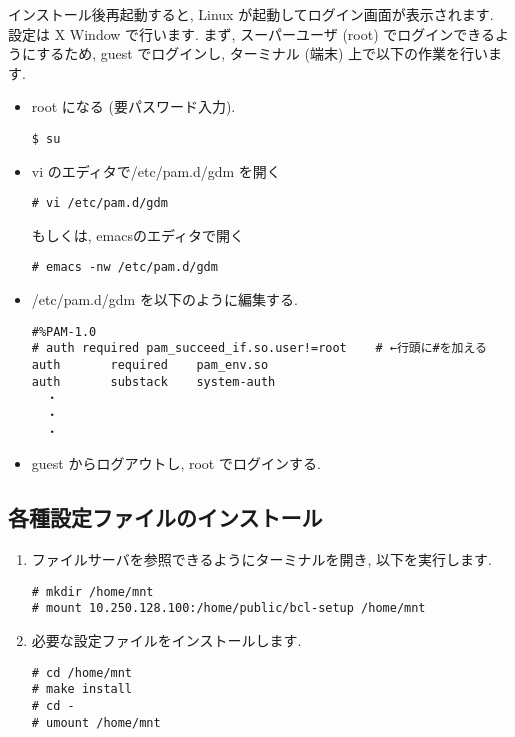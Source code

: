 \documentclass{jarticle}
\begin{document}
インストール後再起動すると, Linux が起動してログイン画面が表示されます.
設定は X Window で行います. まず, スーパーユーザ (root) でログインできるようにするため,
guest でログインし, ターミナル (端末) 上で以下の作業を行います.
\begin{itemize}
	\item root になる (要パスワード入力).
\begin{verbatim}
$ su
\end{verbatim}
	\item vi のエディタで/etc/pam.d/gdm を開く
\begin{verbatim}
# vi /etc/pam.d/gdm
\end{verbatim}
もしくは, emacsのエディタで開く
\begin{verbatim}
# emacs -nw /etc/pam.d/gdm
\end{verbatim}
	\item /etc/pam.d/gdm を以下のように編集する.
\begin{verbatim}
#%PAM-1.0
# auth required pam_succeed_if.so.user!=root    # ←行頭に#を加える
auth       required    pam_env.so
auth       substack    system-auth
  ・
  ・
  ・
\end{verbatim}
	\item guest からログアウトし, root でログインする.
\end{itemize}


\subsection{各種設定ファイルのインストール\label{sec:cfg_ins}}

\begin{enumerate}
	\item ファイルサーバを参照できるようにターミナルを開き, 以下を実行します.
\begin{verbatim}
# mkdir /home/mnt
# mount 10.250.128.100:/home/public/bcl-setup /home/mnt
\end{verbatim}
	\item 必要な設定ファイルをインストールします.
\begin{verbatim}
# cd /home/mnt
# make install
# cd -
# umount /home/mnt
\end{verbatim}
\end{enumerate}
\end{document}
